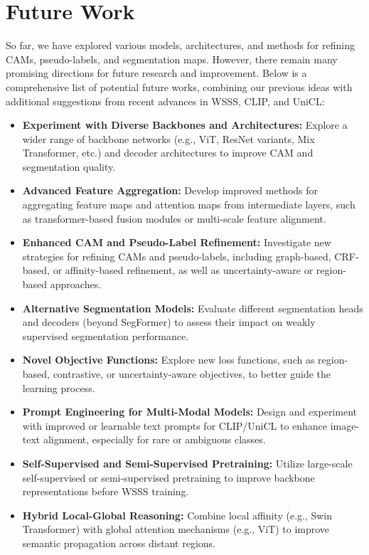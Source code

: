 \section*{Future Work}
\label{sec:future}


So far, we have explored various models, architectures, and methods for refining CAMs, pseudo-labels, and segmentation maps. However, there remain many promising directions for future research and improvement. Below is a comprehensive list of potential future works, combining our previous ideas with additional suggestions from recent advances in WSSS, CLIP, and UniCL:

\begin{itemize}
    \item \textbf{Experiment with Diverse Backbones and Architectures:} Explore a wider range of backbone networks (e.g., ViT, ResNet variants, Mix Transformer, etc.) and decoder architectures to improve CAM and segmentation quality.
    \item \textbf{Advanced Feature Aggregation:} Develop improved methods for aggregating feature maps and attention maps from intermediate layers, such as transformer-based fusion modules or multi-scale feature alignment.
    \item \textbf{Enhanced CAM and Pseudo-Label Refinement:} Investigate new strategies for refining CAMs and pseudo-labels, including graph-based, CRF-based, or affinity-based refinement, as well as uncertainty-aware or region-based approaches.
    \item \textbf{Alternative Segmentation Models:} Evaluate different segmentation heads and decoders (beyond SegFormer) to assess their impact on weakly supervised segmentation performance.
    \item \textbf{Novel Objective Functions:} Explore new loss functions, such as region-based, contrastive, or uncertainty-aware objectives, to better guide the learning process.
    \item \textbf{Prompt Engineering for Multi-Modal Models:} Design and experiment with improved or learnable text prompts for CLIP/UniCL to enhance image-text alignment, especially for rare or ambiguous classes.
    \item \textbf{Self-Supervised and Semi-Supervised Pretraining:} Utilize large-scale self-supervised or semi-supervised pretraining to improve backbone representations before WSSS training.
    \item \textbf{Hybrid Local-Global Reasoning:} Combine local affinity (e.g., Swin Transformer) with global attention mechanisms (e.g., ViT) to improve semantic propagation across distant regions.

\end{itemize}

